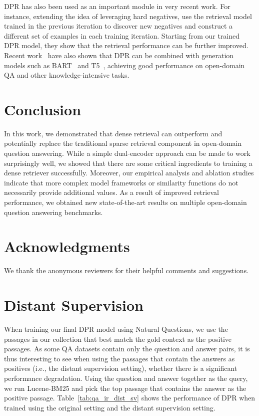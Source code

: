 \documentclass[11pt,a4paper]{article}
\def\model/{DPR}
\begin{document}
\model/ has also been used as an important module in very recent work. For instance, extending the idea of leveraging hard negatives, \citet{Xiong2020ANCE} use the retrieval model trained in the previous iteration to discover new negatives and construct a different set of examples in each training iteration. Starting from our trained \model/ model, they show that the retrieval performance can be further improved. Recent work~\cite{Izacard2020fid, lewis2020rag} have also shown that DPR can be combined with generation models such as BART~\cite{lewis-etal-2020-bart} and T5~\cite{raffel2019T5}, achieving good performance on open-domain QA and other knowledge-intensive tasks.




 \section{Conclusion}
\label{sec:conclusion}

In this work, we demonstrated that dense retrieval can outperform and potentially replace the traditional sparse retrieval component in open-domain question answering. While a simple dual-encoder approach can be made to work surprisingly well, we showed that there are some critical ingredients to training a dense retriever successfully. Moreover, our empirical analysis and ablation studies indicate that more complex model frameworks or similarity functions do not necessarily provide additional values. As a result of improved retrieval performance, we obtained new state-of-the-art results on multiple open-domain question answering benchmarks.


 \section*{Acknowledgments}
We thank the anonymous reviewers for their helpful comments and suggestions.  


\clearpage \appendix

\setcounter{table}{4} 

\section{Distant Supervision}
\label{sec:distant}

When training our final \model/ model using Natural Questions, we use the passages in our collection that best match the gold context as the positive passages.
As some QA datasets contain only the question and answer pairs, it is thus interesting to see when using the passages that contain the answers as positives (i.e., the distant supervision setting), whether there is a significant performance degradation.
Using the question and answer together as the query, we run Lucene-BM25 and pick the top passage that contains the answer as the positive passage.
Table~\ref{tab:qa_ir_dist_sv} shows the performance of \model/ when trained using the original setting and the distant supervision setting. 
\end{document}

